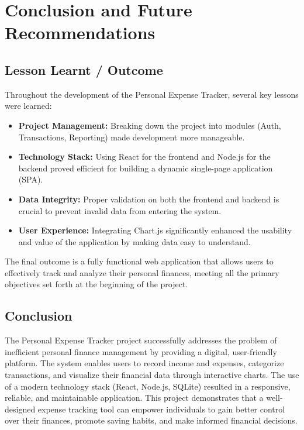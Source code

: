 \documentclass[12pt]{report}
\begin{document}
\chapter{Conclusion and Future Recommendations}

\section{Lesson Learnt / Outcome}
Throughout the development of the Personal Expense Tracker, several key lessons were learned:
\begin{itemize}
    \item \textbf{Project Management:} Breaking down the project into modules (Auth, Transactions, Reporting) made development more manageable.
    \item \textbf{Technology Stack:} Using React for the frontend and Node.js for the backend proved efficient for building a dynamic single-page application (SPA).
    \item \textbf{Data Integrity:} Proper validation on both the frontend and backend is crucial to prevent invalid data from entering the system.
    \item \textbf{User Experience:} Integrating Chart.js significantly enhanced the usability and value of the application by making data easy to understand.
\end{itemize}
The final outcome is a fully functional web application that allows users to effectively track and analyze their personal finances, meeting all the primary objectives set forth at the beginning of the project.

\section{Conclusion}
The Personal Expense Tracker project successfully addresses the problem of inefficient personal finance management by providing a digital, user-friendly platform. The system enables users to record income and expenses, categorize transactions, and visualize their financial data through interactive charts. The use of a modern technology stack (React, Node.js, SQLite) resulted in a responsive, reliable, and maintainable application. This project demonstrates that a well-designed expense tracking tool can empower individuals to gain better control over their finances, promote saving habits, and make informed financial decisions.

\newpage
\end{document}
